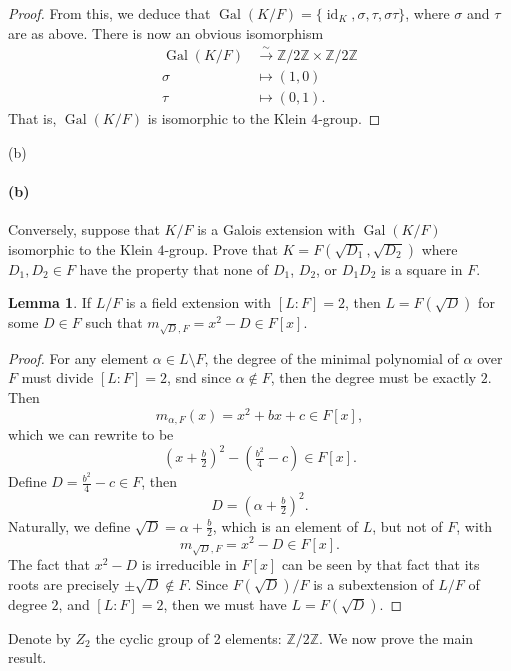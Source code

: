 \documentclass[12pt]{article}
\newenvironment{fullbox}{\begin{lrbox}{\savefullbox}\begin{minipage}{\dimexpr\textwidth-2\fboxsep\relax}}{\end{minipage}\end{lrbox}\begin{center}\framebox[\textwidth]{\usebox{\savefullbox}}\end{center}}
\newenvironment{pbox}[1][]{\begin{fullbox}\ifx#1\empty\else\paragraph{#1}\fi}{\end{fullbox}}
\theoremstyle{definition}
\newtheorem{lemma}{Lemma}
\newcommand{\Z}{\mathbb{Z}}
\newcommand{\<}{\langle}
\renewcommand{\>}{\rangle}
\DeclareMathOperator{\id}{id}
\DeclareMathOperator{\Gal}{Gal}
\begin{document}
\begin{proof}
    From this, we deduce that $\Gal(K/F) = \{\id_K, \sigma, \tau, \sigma\tau\}$, where $\sigma$ and $\tau$ are as above. There is now an obvious isomorphism 
    \begin{align*}
        \Gal(K/F) &\xrightarrow{\sim} \Z/2\Z \times \Z/2\Z \\
            \sigma &\mapsto (1, 0) \\
            \tau &\mapsto (0, 1).
    \end{align*}
    That is, $\Gal(K/F)$ is isomorphic to the Klein $4$-group.

\end{proof}

\begin{pbox}[(b)]
    Conversely, suppose that $K/F$ is a Galois extension with $\Gal(K/F)$ isomorphic to the Klein $4$-group. Prove that $K = F(\sqrt{D_1}, \sqrt{D_2})$ where $D_1, D_2 \in F$ have the property that none of $D_1$, $D_2$, or $D_1D_2$ is a square in $F$.
\end{pbox}

\begin{lemma}
    If $L/F$ is a field extension with $[L : F] = 2$, then $L = F(\sqrt{D})$ for some $D \in F$ such that $m_{\sqrt{D}, F} = x^2 - D \in F[x]$.
\end{lemma}

\begin{proof}
    For any element $\alpha \in L \setminus F$, the degree of the minimal polynomial of $\alpha$ over $F$ must divide $[L : F] = 2$, snd since $\alpha \notin F$, then the degree must be exactly $2$. Then
    \[
        m_{\alpha, F}(x) = x^2 + bx + c \in F[x],
    \]
    which we can rewrite to be
    \[
        \left(x + \tfrac{b}{2}\right)^2 - \left(\tfrac{b^2}{4} - c\right) \in F[x].
    \]
    Define $D = \tfrac{b^2}{4} - c \in F$, then
    \[
        D = \left(\alpha + \tfrac{b}{2}\right)^2.
    \]
    Naturally, we define $\sqrt{D} = \alpha + \tfrac{b}{2}$, which is an element of $L$, but not of $F$, with
    \[
        m_{\sqrt{D}, F} = x^2 - D \in F[x].
    \]
    The fact that $x^2 - D$ is irreducible in $F[x]$ can be seen by that fact that its roots are precisely $\pm\sqrt{D} \notin F$. Since $F(\sqrt{D})/F$ is a subextension of $L/F$ of degree $2$, and $[L : F] = 2$, then we must have $L = F(\sqrt{D})$. 

\end{proof}

\newpage
Denote by $Z_2$ the cyclic group of 2 elements: $\Z/2\Z$. We now prove the main result.
\end{document}
